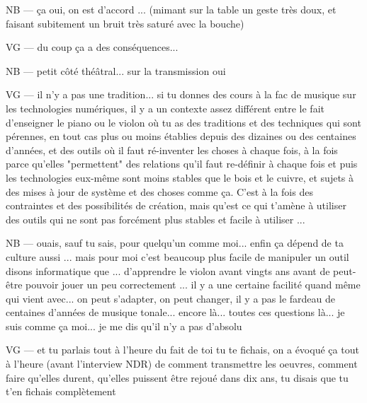 NB — ça oui, on est d'accord ... (mimant sur la table un geste très doux, et faisant subitement un bruit très saturé avec la bouche)

VG — du coup ça a des conséquences...

NB — petit côté théâtral... sur la transmission oui

VG — il n'y a pas une tradition... si tu donnes des cours à la fac de musique sur les technologies numériques, il y a un contexte assez différent entre le fait d'enseigner le piano ou le violon où tu as des traditions et des techniques qui sont pérennes, en tout cas plus ou moins établies depuis des dizaines ou des centaines d'années, et des outils où il faut ré-inventer les choses à chaque fois, à la fois parce qu'elles "permettent" des relations qu'il faut re-définir à chaque fois et puis les technologies eux-même sont moins stables que le bois et le cuivre, et sujets à des mises à jour de système et des choses comme ça. C'est à la fois des contraintes et des possibilités de création, mais qu'est ce qui t'amène à utiliser des outils qui ne sont pas forcément plus stables et facile à utiliser ...

NB — ouais, sauf tu sais, pour quelqu'un comme moi... enfin ça dépend de ta culture aussi ... mais pour moi c'est beaucoup plus facile de manipuler un outil disons informatique que ... d'apprendre le violon avant vingts ans avant de peut-être pouvoir jouer un peu correctement ... il y a une certaine facilité quand même qui vient avec...  on peut s'adapter, on peut changer, il y a pas le fardeau de centaines d'années de musique tonale... encore là... toutes ces questions là... je suis comme ça moi... je me dis qu'il n'y a pas d'absolu

VG — et tu parlais tout à l'heure du fait de toi tu te fichais, on a évoqué ça tout à l'heure (avant l'interview NDR) de comment transmettre les oeuvres, comment faire qu'elles durent, qu'elles puissent être rejoué dans dix ans, tu disais que tu t'en fichais complètement 

